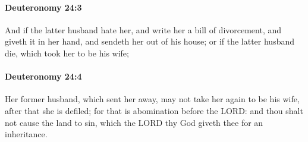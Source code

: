 		\paragraph{Deuteronomy 24:3} %
			\label{DEUTERONOMY-24-3}

			And if the latter husband hate her, and write her a bill of divorcement, and giveth it in her hand, and sendeth her out of his house; or if the latter husband die, which took her to be his wife;


		\paragraph{Deuteronomy 24:4} %
			\label{DEUTERONOMY-24-4}

			Her former husband, which sent her away, may not take her again to be his wife, after that she is defiled; for that is abomination before the LORD: and thou shalt not cause the land to sin, which the LORD thy God giveth thee for an inheritance.

